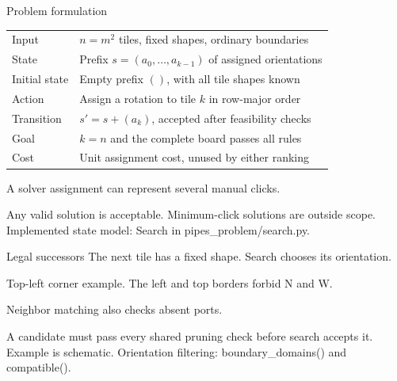 \documentclass[aspectratio=169,11pt]{beamer}
\newcommand{\src}[1]{\vfill{\tiny\color{muted}#1}}
\newcommand{\tile}[4]{%
  \begin{scope}[shift={(#1,#2)}]
    \draw[gray!25] (-.5,-.5) rectangle (.5,.5);
    \foreach \bit/\dx/\dy in {1/0/0.5,2/0.5/0,4/0/-0.5,8/-0.5/0}{%
      \pgfmathtruncatemacro{\hasport}{mod(floor(#3/\bit),2)}
      \ifnum\hasport=1
        \draw[#4,line width=3.6pt,line cap=round] (0,0)--(\dx,\dy);
      \fi}
  \end{scope}}
\begin{document}
\begin{frame}{Problem formulation}
\small
\begin{tabular}{@{}p{}p{}@{}}
\toprule
Input & $n=m^2$ tiles, fixed shapes, ordinary boundaries \\
State & Prefix $s=(a_0,\ldots,a_{k-1})$ of assigned orientations \\
Initial state & Empty prefix $()$, with all tile shapes known \\
Action & Assign a rotation to tile $k$ in row-major order \\
Transition & $s'=s+(a_k)$, accepted after feasibility checks \\
Goal & $k=n$ and the complete board passes all rules \\
Cost & Unit assignment cost, unused by either ranking \\
\bottomrule
\end{tabular}\par
\vspace{5mm}
\normalsize A solver assignment can represent several manual clicks.\par
\small Any valid solution is acceptable. Minimum-click solutions are outside scope.
\src{Implemented state model: Search in pipes\_problem/search.py.}
\end{frame}

\begin{frame}{Legal successors}
The next tile has a fixed shape. Search chooses its orientation.
\vspace{5mm}
\begin{center}
\end{center}
\small Top-left corner example. The left and top borders forbid N and W.\par
\vspace{4mm}
\normalsize Neighbor matching also checks absent ports.\par
\small A candidate must pass every shared pruning check before search accepts it.
\src{Example is schematic. Orientation filtering: boundary\_domains() and compatible().}
\end{frame}
\end{document}
